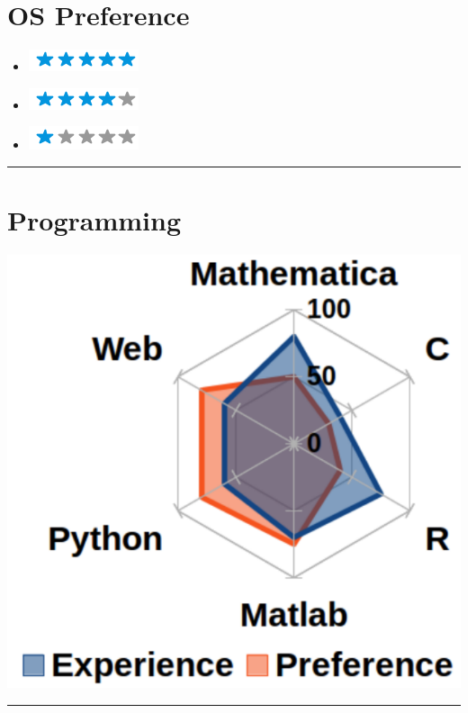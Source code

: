 \documentclass{article}
\begin{document}
\begin{minipage}[t]{0.3\textwidth}
	\section*{\fontsize{18pt}{24pt}\selectfont \color{pblue} OS Preference}
	\vspace{-2mm}
	\begin{itemize}
	\centering
	\item[\textbf{\LARGE \faLinux}]\includegraphics[scale=0.50]{img/5stars.png}\vspace{-2mm}
	\item[\textbf{\LARGE \faWindows}]\includegraphics[scale=0.50]{img/4stars.png}\vspace{-2mm}
    \item[\textbf{\LARGE \faApple}]\includegraphics[scale=0.50]{img/1stars.png}
    \end{itemize}
	\hrule
	\vspace{-2mm}
    \section*{\fontsize{18pt}{24pt}\selectfont \color{pblue} Programming}
	\vspace{-2mm}
	\includegraphics[scale=0.3]{img/programming.pdf}
	\vspace{2mm}
	\hrule
	\vspace{-2mm}

\end{minipage}
\end{document}
